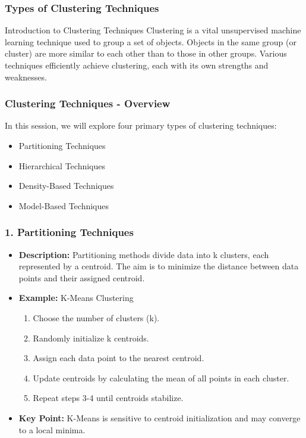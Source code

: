 \documentclass[aspectratio=169]{beamer}
\begin{document}
\begin{frame}[fragile]
    \frametitle{Types of Clustering Techniques}
    \begin{block}{Introduction to Clustering Techniques}
        Clustering is a vital unsupervised machine learning technique used to group a set of objects. 
        Objects in the same group (or cluster) are more similar to each other than to those in other groups. 
        Various techniques efficiently achieve clustering, each with its own strengths and weaknesses.
    \end{block}
\end{frame}

\begin{frame}[fragile]
    \frametitle{Clustering Techniques - Overview}
    In this session, we will explore four primary types of clustering techniques:
    \begin{itemize}
        \item Partitioning Techniques
        \item Hierarchical Techniques
        \item Density-Based Techniques
        \item Model-Based Techniques
    \end{itemize}
\end{frame}

\begin{frame}[fragile]
    \frametitle{1. Partitioning Techniques}
    \begin{itemize}
        \item \textbf{Description:} Partitioning methods divide data into k clusters, each represented by a centroid. The aim is to minimize the distance between data points and their assigned centroid.
        \item \textbf{Example:} K-Means Clustering
        \begin{enumerate}
            \item Choose the number of clusters (k).
            \item Randomly initialize k centroids.
            \item Assign each data point to the nearest centroid.
            \item Update centroids by calculating the mean of all points in each cluster.
            \item Repeat steps 3-4 until centroids stabilize.
        \end{enumerate}
        \item \textbf{Key Point:} K-Means is sensitive to centroid initialization and may converge to a local minima.
    \end{itemize}
\end{frame}
\end{document}
